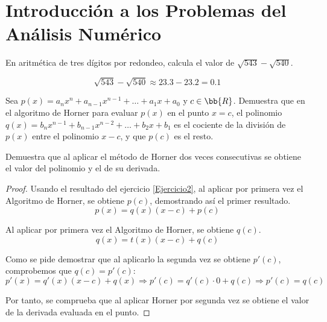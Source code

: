\section{Introducción a los Problemas del Análisis Numérico}


\begin{ejercicio}
    En aritmética de tres dígitos por redondeo, calcula el valor de $\sqrt{543}-\sqrt{540}$.

    \begin{equation*}
        \sqrt{543}-\sqrt{540} \approx 23.3-23.2 = 0.1
    \end{equation*}
\end{ejercicio}

\begin{ejercicio}\label{Ejercicio2}
    Sea $p(x) = a_n x^n + a_{n-1}x^{n-1} + \dots + a_1x+a_0$ y $c\in\bb{R}$. Demuestra que en el algoritmo de Horner para evaluar $p(x)$ en el punto $x = c$, el polinomio $q(x) = b_n x^{n-1} + b_{n-1} x^{n-2} + \dots + b_2x + b_1$ es el cociente de la división de $p(x)$ entre el polinomio $x-c$, y que $p(c)$ es el resto.
\end{ejercicio}

\begin{ejercicio}
    Demuestra que al aplicar el método de Horner dos veces consecutivas se obtiene el valor del polinomio y el de su derivada.
    \begin{proof}
        Usando el resultado del ejercicio \ref{Ejercicio2}, al aplicar por primera vez el Algoritmo de Horner, se obtiene $p(c)$, demostrando así el primer resultado.
        $$p(x) = q(x)(x-c)+p(c)$$
    
        Al aplicar por primera vez el Algoritmo de Horner, se obtiene $q(c)$.
        $$q(x) = t(x)(x-c)+q(c)$$
    
        Como se pide demostrar que al aplicarlo la segunda vez se obtiene $p'(c)$, comprobemos que $q(c)=p'(c)$:
        $$p'(x) = q'(x)(x-c) + q(x) \Longrightarrow p'(c) = q'(c)\cdot 0 + q(c) \Longrightarrow p'(c) = q(c)$$
    
        Por tanto, se comprueba que al aplicar Horner por segunda vez se obtiene el valor de la derivada evaluada en el punto.
    \end{proof}
\end{ejercicio}

